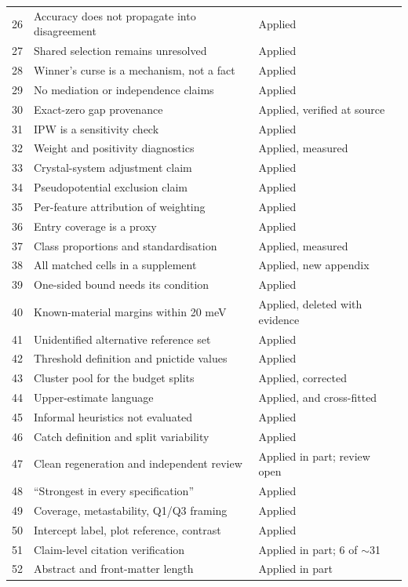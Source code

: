 \documentclass[11pt]{article}
\begin{document}
\begin{longtable}{rp{}l}
26 & Accuracy does not propagate into disagreement & Applied \\
27 & Shared selection remains unresolved & Applied \\
28 & Winner's curse is a mechanism, not a fact & Applied \\
29 & No mediation or independence claims & Applied \\
30 & Exact-zero gap provenance & Applied, verified at source \\
31 & IPW is a sensitivity check & Applied \\
32 & Weight and positivity diagnostics & Applied, measured \\
33 & Crystal-system adjustment claim & Applied \\
34 & Pseudopotential exclusion claim & Applied \\
35 & Per-feature attribution of weighting & Applied \\
36 & Entry coverage is a proxy & Applied \\
37 & Class proportions and standardisation & Applied, measured \\
38 & All matched cells in a supplement & Applied, new appendix \\
39 & One-sided bound needs its condition & Applied \\
40 & Known-material margins within 20 meV & Applied, deleted with evidence \\
41 & Unidentified alternative reference set & Applied \\
42 & Threshold definition and pnictide values & Applied \\
43 & Cluster pool for the budget splits & Applied, corrected \\
44 & Upper-estimate language & Applied, and cross-fitted \\
45 & Informal heuristics not evaluated & Applied \\
46 & Catch definition and split variability & Applied \\
47 & Clean regeneration and independent review & Applied in part; review open \\
48 & ``Strongest in every specification'' & Applied \\
49 & Coverage, metastability, Q1/Q3 framing & Applied \\
50 & Intercept label, plot reference, contrast & Applied \\
51 & Claim-level citation verification & Applied in part; 6 of $\sim$31 \\
52 & Abstract and front-matter length & Applied in part \\
\bottomrule
\end{longtable}
\end{document}
